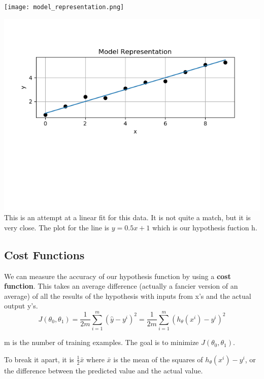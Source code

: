 \texttt{[image: model\_representation.png]}

\includegraphics{python/model_plot_representation.png}\\

This is an attempt at a linear fit for this data.  It is not quite a match, but it is very close.  The plot for the line is $y=0.5x+1$ which is our hypothesis fuction h. 


\subsection{Cost Functions}

We can measure the accuracy of our hypothesis function by using a \textbf{cost function}. This takes an average difference (actually a fancier version of an average) of all the results of the hypothesis with inputs from x's and the actual output y's. \\

\begin{equation}
J(\theta_{0}, \theta_{1}) = \frac{1}{2m} \sum_{i=1}^{m} (\hat{y} -y^{i})^{2} = \frac{1}{2m} \sum_{i=1}^{m} (h_{\theta}(x^{i})-y^{i})^2
\end{equation}

m is the number of training examples. The goal is to minimize $J(\theta_{0}, \theta_{1})$.

To break it apart, it is $\frac{1}{2} \bar{x}$ where $\bar{x}$ is the mean of the squares of $h_{\theta}(x^{i}) -y^{i}$, or the difference between the predicted value and the actual value.\\

